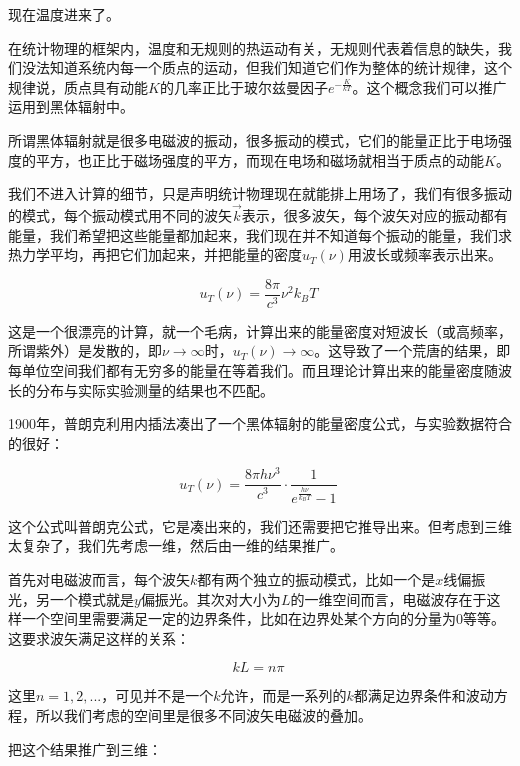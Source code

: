 现在温度进来了。

在统计物理的框架内，温度和无规则的热运动有关，无规则代表着信息的缺失，我们没法知道系统内每一个质点的运动，但我们知道它们作为整体的统计规律，这个规律说，质点具有动能$K$的几率正比于玻尔兹曼因子$e^{-\frac{K}{kT}}$。这个概念我们可以推广运用到黑体辐射中。

所谓黑体辐射就是很多电磁波的振动，很多振动的模式，它们的能量正比于电场强度的平方，也正比于磁场强度的平方，而现在电场和磁场就相当于质点的动能$K$。

我们不进入计算的细节，只是声明统计物理现在就能排上用场了，我们有很多振动的模式，每个振动模式用不同的波矢$\vec k$表示，很多波矢，每个波矢对应的振动都有能量，我们希望把这些能量都加起来，我们现在并不知道每个振动的能量，我们求热力学平均，再把它们加起来，并把能量的密度$u_T(\nu)$用波长或频率表示出来。

\begin{equation}
u_T(\nu) = \frac{ 8 \pi }{ c^3 } \nu^2 k_B T~
\end{equation}

这是一个很漂亮的计算，就一个毛病，计算出来的能量密度对短波长（或高频率，所谓紫外）是发散的，即$\nu \to \infty$时，$u_T(\nu) \to \infty$。这导致了一个荒唐的结果，即每单位空间我们都有无穷多的能量在等着我们。而且理论计算出来的能量密度随波长的分布与实际实验测量的结果也不匹配。

1900年，普朗克利用内插法凑出了一个黑体辐射的能量密度公式，与实验数据符合的很好：

\begin{equation}
u_T (\nu )  = \frac{ 8 \pi h \nu^3  }{ c^3 } \cdot  \frac{1 }{ e^{ \frac{ h \nu }{ k_B T } }  - 1 }~
\end{equation}

这个公式叫普朗克公式，它是凑出来的，我们还需要把它推导出来。但考虑到三维太复杂了，我们先考虑一维，然后由一维的结果推广。

首先对电磁波而言，每个波矢$k$都有两个独立的振动模式，比如一个是$x$线偏振光，另一个模式就是$y$偏振光。其次对大小为$L$的一维空间而言，电磁波存在于这样一个空间里需要满足一定的边界条件，比如在边界处某个方向的分量为0等等。这要求波矢满足这样的关系：

\begin{equation}
k L = n \pi~
\end{equation}

这里$n = 1, 2, ...$，可见并不是一个$k$允许，而是一系列的$k$都满足边界条件和波动方程，所以我们考虑的空间里是很多不同波矢电磁波的叠加。

把这个结果推广到三维：

